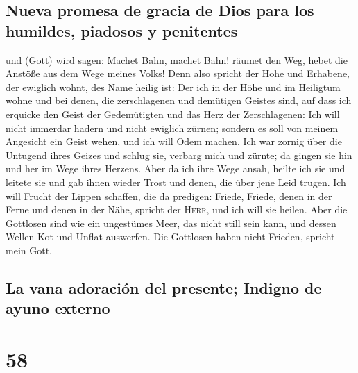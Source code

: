 \hypertarget{nueva-promesa-de-gracia-de-dios-para-los-humildes-piadosos-y-penitentes}{%
\subsection{Nueva promesa de gracia de Dios para los humildes, piadosos
y
penitentes}\label{nueva-promesa-de-gracia-de-dios-para-los-humildes-piadosos-y-penitentes}}

 und (Gott) wird sagen: Machet Bahn, machet Bahn! räumet
den Weg, hebet die Anstöße aus dem Wege meines Volks! 
Denn also spricht der Hohe und Erhabene, der ewiglich wohnt, des Name
heilig ist: Der ich in der Höhe und im Heiligtum wohne und bei denen,
die zerschlagenen und demütigen Geistes sind, auf dass ich erquicke den
Geist der Gedemütigten und das Herz der Zerschlagenen: 
Ich will nicht immerdar hadern und nicht ewiglich zürnen; sondern es
soll von meinem Angesicht ein Geist wehen, und ich will Odem machen.
 Ich war zornig über die Untugend ihres Geizes und schlug
sie, verbarg mich und zürnte; da gingen sie hin und her im Wege ihres
Herzens.  Aber da ich ihre Wege ansah, heilte ich sie und
leitete sie und gab ihnen wieder Trost und denen, die über jene Leid
trugen.  Ich will Frucht der Lippen schaffen, die da
predigen: Friede, Friede, denen in der Ferne und denen in der Nähe,
spricht der \textsc{Herr}, und ich will sie heilen.  Aber
die Gottlosen sind wie ein ungestümes Meer, das nicht still sein kann,
und dessen Wellen Kot und Unflat auswerfen.  Die
Gottlosen haben nicht Frieden, spricht mein Gott.

\hypertarget{la-vana-adoraciuxf3n-del-presente-indigno-de-ayuno-externo}{%
\subsection{La vana adoración del presente; Indigno de ayuno
externo}\label{la-vana-adoraciuxf3n-del-presente-indigno-de-ayuno-externo}}

\hypertarget{section-57}{%
\section{58}\label{section-57}}


